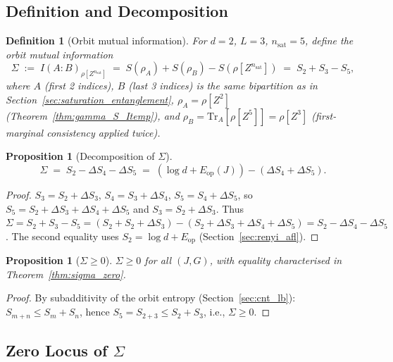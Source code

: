 \documentclass[12pt,a4paper]{article}
\newtheorem{proposition}[theorem]{Proposition}
\newtheorem{definition}[theorem]{Definition}
\begin{document}
\subsection{Definition and Decomposition}
\label{subsec:sigma_def}

\begin{definition}[Orbit mutual information]
\label{def:sigma}
For $d=2$, $L=3$, $n_{\mathrm{sat}}=5$, define the \emph{orbit mutual information}
\begin{equation}
  \Sigma \;:=\; I(A:B)_{\rho[Z^{n_{\mathrm{sat}}}]}
  \;=\; S(\rho_A)+S(\rho_B)-S(\rho[Z^{n_{\mathrm{sat}}}])
  \;=\; S_2+S_3-S_5,
  \label{eq:sigma_def}
\end{equation}
where $A$ (first 2 indices), $B$ (last 3 indices) is the same bipartition as in Section~\ref{sec:saturation_entanglement},
$\rho_A=\rho[Z^2]$ (Theorem~\ref{thm:gamma_S_Itemp}), and $\rho_B=\mathrm{Tr}_A[\rho[Z^5]]=\rho[Z^3]$
(first-marginal consistency applied twice).
\end{definition}

\begin{proposition}[Decomposition of $\Sigma$]
\label{prop:sigma_decomp}
\[
  \Sigma \;=\; S_2 - \Delta S_4 - \Delta S_5 \;=\; (\log d + E_{\mathrm{op}}(J)) - (\Delta S_4 + \Delta S_5).
\]
\end{proposition}

\begin{proof}
$S_3=S_2+\Delta S_3$, $S_4=S_3+\Delta S_4$, $S_5=S_4+\Delta S_5$, so
$S_5=S_2+\Delta S_3+\Delta S_4+\Delta S_5$ and
$S_3=S_2+\Delta S_3$.
Thus $\Sigma=S_2+S_3-S_5=(S_2+S_2+\Delta S_3)-(S_2+\Delta S_3+\Delta S_4+\Delta S_5)=S_2-\Delta S_4-\Delta S_5$.
The second equality uses $S_2=\log d+E_{\mathrm{op}}$ (Section~\ref{sec:renyi_afl}).
\end{proof}

\begin{proposition}[$\Sigma\geq 0$]
$\Sigma\geq 0$ for all $(J,G)$, with equality characterised in Theorem~\ref{thm:sigma_zero}.
\end{proposition}
\begin{proof}
By subadditivity of the orbit entropy (Section~\ref{sec:cnt_lb}): $S_{m+n}\leq S_m+S_n$,
hence $S_5=S_{2+3}\leq S_2+S_3$, i.e., $\Sigma\geq 0$.
\end{proof}

\subsection{Zero Locus of $\Sigma$}
\label{subsec:sigma_zero}
\end{document}
